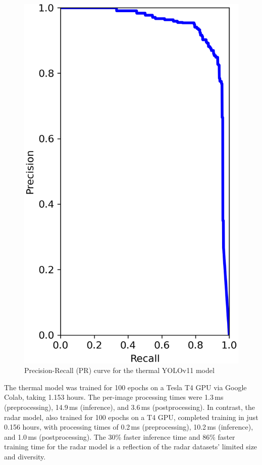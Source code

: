 \begin{figure} %
  \centering
  \includegraphics[width=\linewidth]{figs/Rory/APR_curve_therm.png} %
  \caption{Precision-Recall (PR) curve for the thermal YOLOv11 model}
  \label{fig:pr_curve}
\end{figure}

The thermal model was trained for 100 epochs on a Tesla T4 GPU via Google Colab, taking 1.153 hours. The per-image processing times were 1.3\,ms (preprocessing), 14.9\,ms (inference), and 3.6\,ms (postprocessing). In contrast, the radar model, also trained for 100 epochs on a T4 GPU, completed training in just 0.156 hours, with processing times of 0.2\,ms (preprocessing), 10.2\,ms (inference), and 1.0\,ms (postprocessing). The 30\% faster inference time and 86\% faster training time for the radar model is a reflection of the radar datasets' limited size and diversity.

